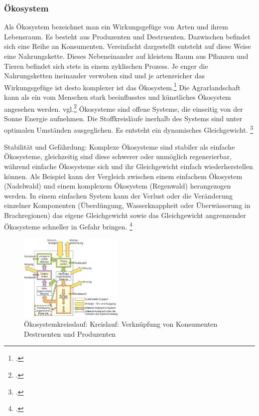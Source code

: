 \documentclass{scrartcl}
\begin{document}
\subsubsection{Ökosystem}
Als Ökosystem bezeichnet man ein Wirkungsgefüge von Arten und ihrem Lebensraum. Es besteht aus Produzenten und Destruenten. Dazwischen befindet sich eine Reihe an Konsumenten. Vereinfacht dargestellt entsteht auf diese Weise eine Nahrungskette. Dieses Nebeneinander auf kleistem Raum aus Pflanzen und Tieren befindet sich stets in einem zyklischen Prozess. Je enger die Nahrungsketten ineinander verwoben sind und je artenreicher das Wirkungsgefüge ist desto komplexer ist das Ökosystem.\footcite{NachhaltigeBrockhaus.de} Die Agrarlandschaft kann als ein vom Menschen stark beeinflusstes und künstliches Ökosystem angesehen werden. vgl.\footcite{BrockhausOkosystem}
Ökosysteme sind offene Systeme, die einseitig von der Sonne Energie aufnehmen. Die Stoffkreisläufe inerhalb des Systems sind unter optimalen Umständen ausgeglichen. Es entsteht ein dynamisches Gleichgewicht. \footcite{BrockhausOkosystem}

\hfill \break
Stabilität und Gefährdung: Komplexe Ökosysteme sind stabiler als einfache Ökosysteme, gleichzeitig sind diese schwerer oder unmöglich regenerierbar, während einfache Ökosysteme sich und ihr Gleichgewicht einfach wiederherstellen können. Als Beispiel kann der Vergleich zwischen einem einfachem Ökosystem (Nadelwald) und einem komplexem Ökosystem (Regenwald) herangezogen werden.
In einem einfachen System kann der Verlust oder die Veränderung einzelner Komponenten (Überdüngung, Wasserknappheit oder Überwässerung in Brachregionen) das eigene Gleichgewicht sowie das Gleichgewicht angrenzender Ökosysteme schneller in Gefahr bringen. \footcite{DefinitionWirtschaftslexikone}

\begin{figure}[htp]
\centering
\includegraphics[width=5cm]{image_folder/oekosystemkreisslauf.png}
\caption{Ökosystemkreisslauf: Kreislauf: Verknüpfung von Konsumenten Destruenten und Produzenten}
\label{fig:Ökosystemkreisslauf}
\end{figure}
        
\end{document}
